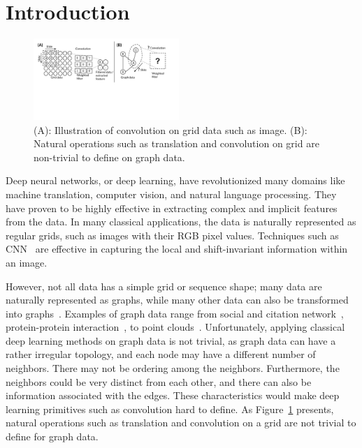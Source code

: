 

\section{Introduction}
\label{sec:intro}
\begin{figure}[t]
 \centering
\includegraphics[width=0.49\textwidth]{./images/gridvsgraph.pdf}
 \caption{(A): Illustration of convolution on grid data such as image. (B): Natural operations such as translation and convolution on grid are non-trivial to define on graph data.}
 \label{fig:gridvsgraph}
\end{figure}

Deep neural networks, or deep learning, have revolutionized many domains like machine translation, computer vision, and natural language processing. They have proven to be highly effective in extracting complex and implicit features from the data. In many classical applications, the data is naturally represented as regular grids, such as images with their RGB pixel values. Techniques such as CNN~\cite{cnn0, cnn1, cnn2} are effective in capturing the local and shift-invariant information within an image. 

However, not all data has a simple grid or sequence shape; many data are naturally represented as graphs, while many other data can also be transformed into graphs~\cite{Xu2017}. Examples of graph data range from social and citation network~\cite{social, citation}, protein-protein interaction~\cite{ppi}, to point clouds~\cite{pointcloud}. Unfortunately, applying classical deep learning methods on graph data is not trivial, as graph data can have a rather irregular topology, and each node may have a different number of neighbors. There may not be ordering among the neighbors. Furthermore, the neighbors could be very distinct from each other, and there can also be information associated with the edges. These characteristics would make deep learning primitives such as convolution hard to define. As Figure~\ref{fig:gridvsgraph} presents, natural operations such as translation and convolution on a grid are not trivial to define for graph data.

